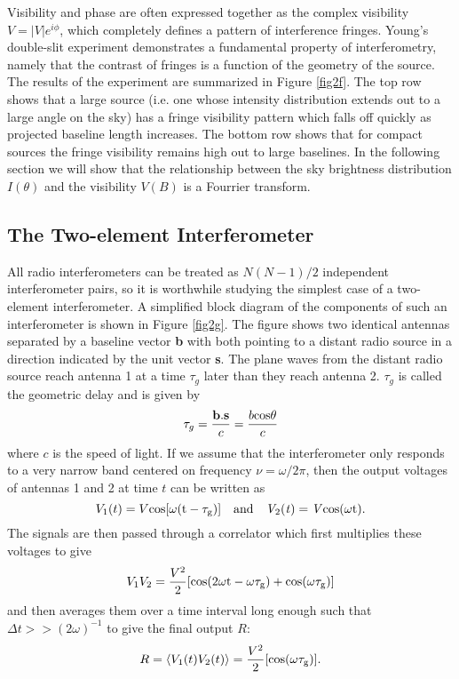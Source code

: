 Visibility and phase are often expressed together as the complex visibility $V=|V|e^{i\phi}$, which completely defines a pattern of interference fringes. Young's double-slit experiment demonstrates a fundamental property of interferometry, namely that the contrast of fringes is a function of the geometry of the source. The results of the experiment are summarized in Figure \ref{fig2f}. The top row shows that a large source (i.e. one whose intensity distribution extends out to a large angle on the sky) has a fringe visibility pattern which falls off quickly as projected baseline length increases. The bottom row shows that for compact sources the fringe visibility remains high out to large baselines. In the following section we will show that the relationship between the sky brightness distribution $I(\theta)$ and the visibility $V(B)$ is a Fourrier transform.

\subsection{The Two-element Interferometer}\label{subsec:5}
All radio interferometers can be treated as $N(N-1)/2$ independent interferometer pairs, so it is worthwhile studying the simplest case of a two-element interferometer. A simplified block diagram of the components of such an interferometer is shown in Figure \ref{fig2g}. The figure shows two identical antennas separated by a baseline vector \textbf{b} with both pointing to a distant radio source in a direction indicated by the unit vector \textbf{s}. The plane waves from the distant radio source reach antenna 1 at a time $\tau _g$ later than they reach antenna 2. $\tau _g$ is called the geometric delay and is given by
\begin{equation}
\tau _{g}=\frac{\textbf{b}.\textbf{s}}{c}=\frac{b\rm{cos}\theta}{c}
\end{equation}
where $c$ is the speed of light. If we assume that the interferometer only responds to a very narrow band centered on frequency $\nu=\omega /2\pi$, then the output voltages of antennas 1 and 2 at time $t$ can be written as 
\begin{equation}
V_1(t)=V\rm{cos}[\omega(t-\tau _g)] \ \ \ \rm{and} \ \ \ \mathit{V_{\rm{2}}(t)=V\rm{cos}(\omega t)}.
\end{equation}
The signals are then passed through a correlator which first multiplies these voltages to give
\begin{equation}
V_1 V_2=\frac{V^2}{2}[\rm{cos(2\omega t -\omega \tau _g)+\rm{cos}(\omega \tau _g)}]
\end{equation}
and then averages them over a time interval long enough such that $\Delta t >> (2\omega)^{-1}$ to give the final output $R$:
\begin{equation}
R=\langle V_1(t)V_2(t)\rangle = \frac{V^2}{2}[\rm{cos}(\omega \tau _g)].
\end{equation}

